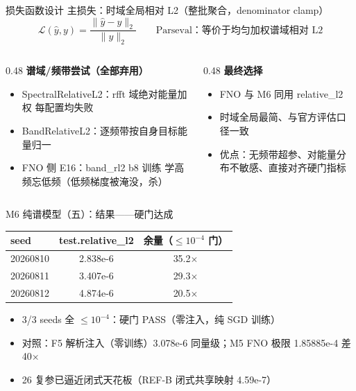 \documentclass[aspectratio=169]{beamer}
\newcommand{\pos}[1]{\textcolor{blue!70!black}{#1}}
\newcommand{\con}[1]{\textcolor{orange!85!black}{#1}}
\newcommand{\HL}[1]{\textcolor{green!45!black}{#1}}
\begin{document}
\begin{frame}{损失函数设计}
  主损失：时域全局相对 L2（整批聚合，denominator clamp）
  \begin{equation*}
    \mathcal{L}(\hat y, y)=\frac{\lVert \hat y-y\rVert_2}{\lVert y\rVert_2}
    \qquad\text{Parseval：等价于均匀加权谱域相对 L2}
  \end{equation*}
  \begin{columns}[T]
    \begin{column}{0.48\textwidth}
      \textbf{谱域/频带尝试（全部弃用）}
      \begin{itemize}
        \item SpectralRelativeL2：rfft 域绝对能量加权 \con{每配置均失败}
        \item BandRelativeL2：逐频带按自身目标能量归一
        \item FNO 侧 E16：band\_rl2 b8 训练 \con{学高频忘低频}（低频梯度被淹没，杀）
      \end{itemize}
    \end{column}
    \begin{column}{0.48\textwidth}
      \textbf{最终选择}
      \begin{itemize}
        \item FNO 与 M6 同用 \pos{relative\_l2}
        \item \pos{时域全局最简、与官方评估口径一致}
        \item 优点：无频带超参、对能量分布不敏感、直接对齐硬门指标
      \end{itemize}
    \end{column}
  \end{columns}
\end{frame}

\begin{frame}{M6 纯谱模型（五）：结果——硬门达成}
  \begin{table}
    \centering
    \begin{tabular}{lcc}
      \toprule
      seed & test.relative\_l2 & 余量（$\le 10^{-4}$ 门） \\
      \midrule
      20260810 & 2.838e-6 & 35.2$\times$ \\
      20260811 & 3.407e-6 & 29.3$\times$ \\
      20260812 & 4.874e-6 & 20.5$\times$ \\
      \bottomrule
    \end{tabular}
  \end{table}
  \begin{itemize}
    \item \HL{3/3 seeds 全 $\le 10^{-4}$：硬门 PASS（零注入，纯 SGD 训练）}
    \item 对照：F5 解析注入（零训练）3.078e-6 同量级；M5 FNO 极限 1.85885e-4 差 40$\times$
    \item 26 复参已逼近闭式天花板（REF-B 闭式共享映射 4.59e-7）
  \end{itemize}
\end{frame}
\end{document}
